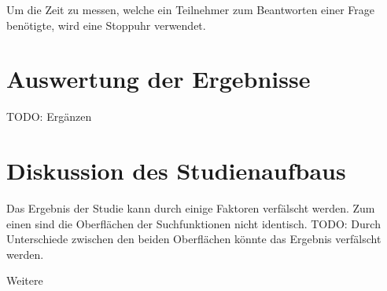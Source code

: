 Um die Zeit zu messen, welche ein Teilnehmer zum Beantworten einer Frage benötigte, wird eine Stoppuhr verwendet.
\section{Auswertung der Ergebnisse}
TODO: Ergänzen

\section{Diskussion des Studienaufbaus}

Das Ergebnis der Studie kann durch einige Faktoren verfälscht werden.
Zum einen sind die Oberflächen der Suchfunktionen nicht identisch.
TODO: Durch Unterschiede zwischen den beiden Oberflächen könnte das Ergebnis verfälscht werden. 

Weitere 

